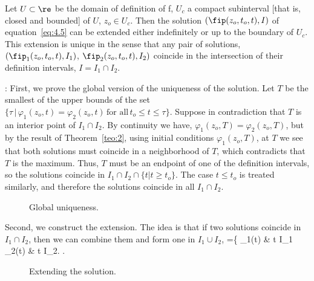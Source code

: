 \begin{cor}
Let $U \subset  \re $ be the domain of definition of f, $U_c $ a
compact subinterval [that is, closed and bounded] of $U$, $z_o \in U_c $.
Then the solution $(\fip (z_o,t_o,t), I)$ of equation~\ref{eq:4.5} can be extended either indefinitely or up to
the boundary of $U_c $. 
This extension is unique in the sense that any pair of solutions,
$(\fip_1(z_o,t_o,t), I_1 )$, $\fip_2(z_o,t_o,t), I_2 )$ coincide in
the intersection of their definition intervals, $I = I_1 \cap
I_2$. 
\label{cor:4_2}
\end{cor}

\pru:
First, we prove the global version of the uniqueness of the solution.
Let $T$ be the smallest of the upper bounds of the set 
$\{\tau\, |\, \varphi_1(z_o,t) = \varphi_2(z_o,t) \,
\text{for all}  \, t_o \le t \le \tau \}$.
Suppose in contradiction that $T$ is an interior point of 
$I_1 \cap I_2 $. 
By continuity we have,
$\varphi_1(z_o,T) = \varphi_2(z_o,T) $, but by the result of
Theorem~\ref{teo:2}, using initial conditions
$\varphi_1(z_o,T)$, at $ T$
we see that both solutions must 
coincide in a neighborhood of $T$, which contradicts that $T$ is the maximum.
Thus, $T$ must be an endpoint of one of the definition intervals, so the solutions coincide in 
$I_1 \cap I_2 \cap \{t | t \geq t_o\} $. 
The case $t \leq t_o $ is treated similarly, and therefore the
solutions coincide in all $I_1 \cap I_2 $. 

\begin{figure}[htbp]
  \begin{center}
    \caption{Global uniqueness.}
    \label{fig:4_4}
  \end{center}
\end{figure}

Second, we construct the extension. The idea is that if two solutions coincide in $I_1 \cap I_2 $, then we can combine them and form one
in $I_1 \cup I_2 $, 
\beq 
\fit =\left\{   \fip_1(t) & t \in I_1\\
           \fip_2(t) & t \in I_2. 
         \earr\right.
\eeq

\begin{figure}[htbp]
  \begin{center}
    \caption{Extending the solution.}
    \label{fig:4_5}
  \end{center}
\end{figure}

